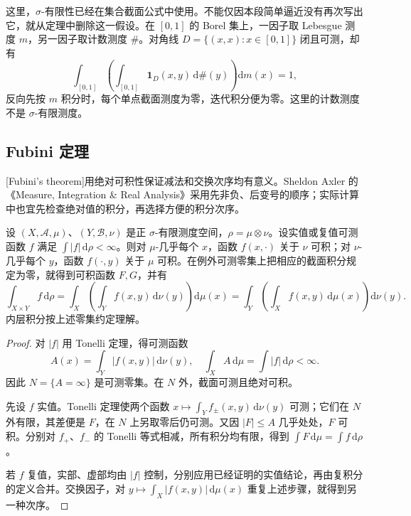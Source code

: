 \ProseParagraphBreak

这里，\(\sigma\)-有限性已经在集合截面公式中使用。不能仅因本段简单逼近没有再次写出它，就从定理中删除这一假设。在 \([0,1]\) 的 Borel 集上，一因子取 Lebesgue 测度 \(m\)，另一因子取计数测度 \(\#\)。对角线 \(D=\{(x,x):x\in[0,1]\}\) 闭且可测，却有
\[
\int_{[0,1]}\left(\int_{[0,1]}\mathbf1_D(x,y)\,\mathrm d\#(y)\right)\mathrm dm(x)=1,
\]
反向先按 \(m\) 积分时，每个单点截面测度为零，迭代积分便为零。这里的计数测度不是 \(\sigma\)-有限测度。

\subsection{Fubini 定理}
\label{b1:subsec:070302}

[Fubini's theorem]用绝对可积性保证减法和交换次序均有意义。Sheldon Axler 的《Measure, Integration \& Real Analysis》\cite[Section 5B]{Axler2020Measure}采用先非负、后变号的顺序；实际计算中也宜先检查绝对值的积分，再选择方便的积分次序。

\begin{theorem}[Fubini]\label{b1:thm:fubini}
设 \((X,\mathcal A,\mu)\)、\((Y,\mathcal B,\nu)\) 是正 \(\sigma\)-有限测度空间，\(\rho=\mu\otimes\nu\)。设实值或复值可测函数 \(f\) 满足 \(\int|f|\,\mathrm d\rho<\infty\)。则对 \(\mu\)-几乎每个 \(x\)，函数 \(f(x,\cdot)\) 关于 \(\nu\) 可积；对 \(\nu\)-几乎每个 \(y\)，函数 \(f(\cdot,y)\) 关于 \(\mu\) 可积。在例外可测零集上把相应的截面积分规定为零，就得到可积函数 \(F,G\)，并有
\[
\int_{X\times Y}f\,\mathrm d\rho
=\int_X\left(\int_Yf(x,y)\,\mathrm d\nu(y)\right)\mathrm d\mu(x)
=\int_Y\left(\int_Xf(x,y)\,\mathrm d\mu(x)\right)\mathrm d\nu(y).
\]
内层积分按上述零集约定理解。
\end{theorem}
\begin{proof}
对 \(|f|\) 用 Tonelli 定理，得可测函数
\[
A(x)=\int_Y|f(x,y)|\,\mathrm d\nu(y),\quad
\int_XA\,\mathrm d\mu=\int|f|\,\mathrm d\rho<\infty.
\]
因此 \(N=\{A=\infty\}\) 是可测零集。在 \(N\) 外，截面可测且绝对可积。

先设 \(f\) 实值。Tonelli 定理使两个函数 \(x\mapsto\int_Yf_\pm(x,y)\,\mathrm d\nu(y)\) 可测；它们在 \(N\) 外有限，其差便是 \(F\)，在 \(N\) 上另取零后仍可测。又因 \(|F|\leq A\) 几乎处处，\(F\) 可积。分别对 \(f_+\)、\(f_-\) 的 Tonelli 等式相减，所有积分均有限，得到 \(\int F\,\mathrm d\mu=\int f\,\mathrm d\rho\)。

若 \(f\) 复值，实部、虚部均由 \(|f|\) 控制，分别应用已经证明的实值结论，再由复积分的定义合并。交换因子，对 \(y\mapsto\int_X|f(x,y)|\,\mathrm d\mu(x)\) 重复上述步骤，就得到另一种次序。
\end{proof}

